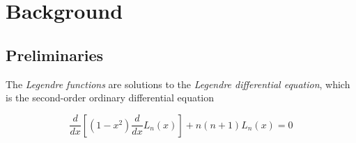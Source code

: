 \documentclass[11pt]{article} %
\theoremstyle{plain}
\theoremstyle{definition}
\theoremstyle{remark}
\begin{document}
\newpage

\section{Background}

\subsection{Preliminaries}

The \emph{Legendre functions} are solutions to the \emph{Legendre differential 
equation}, which is the second-order ordinary differential equation

\begin{equation} \label{eq:legendre_de}
\frac{d}{dx}\left[(1-x^2)\frac{d}{dx}L_n(x)\right]+n(n+1)L_n(x)=0
\end{equation}
\end{document}
